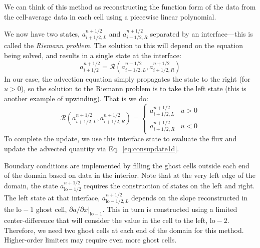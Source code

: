 We can think of this method as reconstructing the function form of the
data from the cell-average data in each cell using  a piecewise linear
polynomial. 

We now have two states, $a_{i+1/2,L}^{n+1/2}$ and
$a_{i+1/2,R}^{n+1/2}$ separated by an interface---this is called the
{\em Riemann problem}.
%
The solution to this will depend on the equation being solved, and
results in a single state at the interface:
\begin{equation}
a_{i+1/2}^{n+1/2} = \mathcal{R}(a_{i+1/2,L}^{n+1/2},a_{i+1/2,R}^{n+1/2})
\end{equation}
In our case, the advection equation simply propagates the state to the
right (for $u > 0$), so the solution to the Riemann problem is to take
the left state (this is another example of upwinding).  That is we do:
\begin{equation}
\mathcal{R}(a_{i+1/2,L}^{n+1/2},a_{i+1/2,R}^{n+1/2}) = \left \{ \begin{array}{ccc} a_{i+1/2,L}^{n+1/2} & u > 0 \\[2mm] a_{i+1/2,R}^{n+1/2} & u < 0 \end{array} \right .
\label{eq:riemannsolve}
\end{equation}
To complete the update, we use this interface state to evaluate the flux
and update the advected quantity via Eq.~\ref{eq:consupdate1d}.

Boundary conditions are implemented by filling the ghost cells outside
each end of the domain based on data in the interior.  Note that at
the very left edge of the domain, the state
$a^{n+1/2}_{\mathrm{lo}-1/2}$ requires the construction of states on
the left and right.  The left state at that interface,
$a^{n+1/2}_{\mathrm{lo}-1/2,L}$ depends on the slope reconstructed in
the $\mathrm{lo}-1$ ghost cell, $\partial a/\partial x
|_{\mathrm{lo}-1}$.  This in turn is constructed using a limited
center-difference that will consider the value in the cell to the
left, $\mathrm{lo-2}$.  Therefore, we need two ghost cells at each end
of the domain for this method.  Higher-order limiters may require even
more ghost cells.

